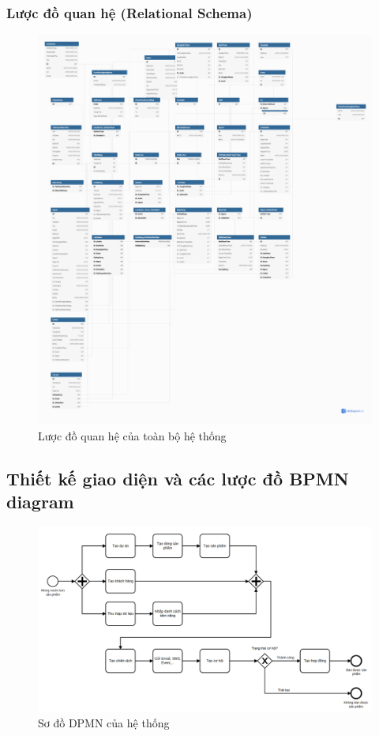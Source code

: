 \documentclass[12pt,a4paper]{article}
\begin{document}
    \subsubsection{Lược đồ quan hệ (Relational Schema)}
    \begin{figure}[H]
        \centering \includegraphics[width=\textwidth]{Img/RS/RS.png}
        \caption{Lược đồ quan hệ của toàn bộ hệ thống}
        \label{rs_all}
    \end{figure}

    \subsection{Thiết kế giao diện và các lược đồ BPMN diagram}
    \begin{figure}[H]
        \centering \includegraphics[width=\textwidth]{Img/DPMN/rccare.png}
        \caption{Sơ đồ DPMN của hệ thống}
        \label{bpmn_all}
    \end{figure}
\end{document}
